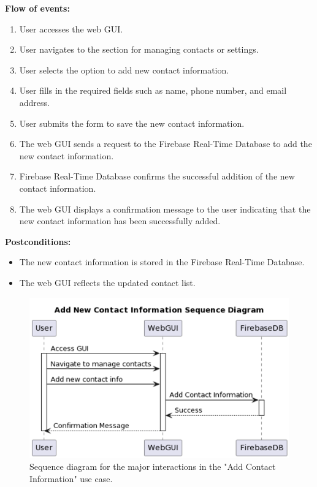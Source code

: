 \textbf{Flow of events:}
\begin{enumerate}
    \item User accesses the web GUI.
    \item User navigates to the section for managing contacts or settings.
    \item User selects the option to add new contact information.
    \item User fills in the required fields such as name, phone number, and email address.
    \item User submits the form to save the new contact information.
    \item The web GUI sends a request to the Firebase Real-Time Database to add the new contact information.
    \item Firebase Real-Time Database confirms the successful addition of the new contact information.
    \item The web GUI displays a confirmation message to the user indicating that the new contact information has been
          successfully added.
\end{enumerate}

\textbf{Postconditions:}
\begin{itemize}
    \item The new contact information is stored in the Firebase Real-Time Database.
    \item The web GUI reflects the updated contact list.
\end{itemize}

\begin{figure}[H]
    \centering
    \includegraphics[width=\linewidth]{../assets/NewContact.png}
    \caption{Sequence diagram for the major interactions in the "Add Contact Information" use case.}
\end{figure}


